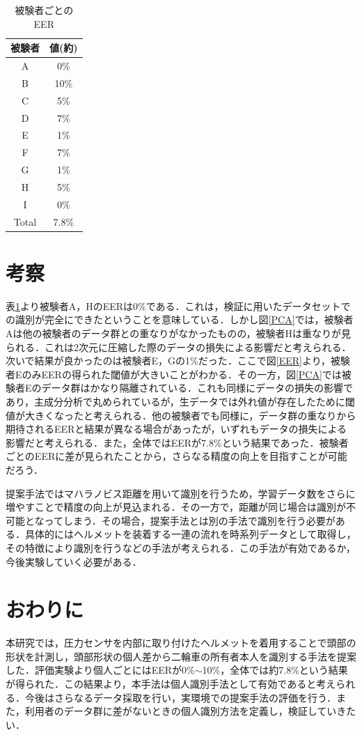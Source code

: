 \documentclass[Japanese]{dicomopapers}
\begin{document}
\begin{table}[htb]
  \center
  \begin{tabular}{|c|c|} \hline
    被験者 & 値(約) \\ \hline \hline
    A & 0\% \\
    B & 10\% \\
    C & 5\% \\
    D & 7\% \\
    E & 1\% \\
    F & 7\% \\
    G & 1\% \\
    H & 5\% \\
    I & 0\% \\ \hline
    Total & 7.8\% \\ \hline
  \end{tabular}
  \caption{被験者ごとのEER}
  \label{EER_num}
\end{table}

\section{考察}
表\ref{EER_num}より被験者A，HのEERは0\%である．これは，検証に用いたデータセットでの識別が完全にできたということを意味している．しかし図\ref{PCA}では，被験者Aは他の被験者のデータ群との重なりがなかったものの，被験者Hは重なりが見られる．これは2次元に圧縮した際のデータの損失による影響だと考えられる．次いで結果が良かったのは被験者E，Gの1\%だった．ここで図\ref{EER}より，被験者EのみEERの得られた閾値が大きいことがわかる．その一方，図\ref{PCA}では被験者Eのデータ群はかなり隔離されている．これも同様にデータの損失の影響であり，主成分分析で丸められているが，生データでは外れ値が存在したために閾値が大きくなったと考えられる．他の被験者でも同様に，データ群の重なりから期待されるEERと結果が異なる場合があったが，いずれもデータの損失による影響だと考えられる．また，全体ではEERが7.8\%という結果であった．被験者ごとのEERに差が見られたことから，さらなる精度の向上を目指すことが可能だろう．\par
提案手法ではマハラノビス距離を用いて識別を行うため，学習データ数をさらに増やすことで精度の向上が見込まれる．その一方で，距離が同じ場合は識別が不可能となってしまう．その場合，提案手法とは別の手法で識別を行う必要がある．具体的にはヘルメットを装着する一連の流れを時系列データとして取得し，その特徴により識別を行うなどの手法が考えられる．この手法が有効であるか，今後実験していく必要がある．

\section{おわりに}
本研究では，圧力センサを内部に取り付けたヘルメットを着用することで頭部の形状を計測し，頭部形状の個人差から二輪車の所有者本人を識別する手法を提案した．評価実験より個人ごとにはEERが0\%$\sim$10\%，全体では約7.8\%という結果が得られた．この結果より，本手法は個人識別手法として有効であると考えられる．今後はさらなるデータ採取を行い，実環境での提案手法の評価を行う．また，利用者のデータ群に差がないときの個人識別方法を定義し，検証していきたい．



\end{document}
